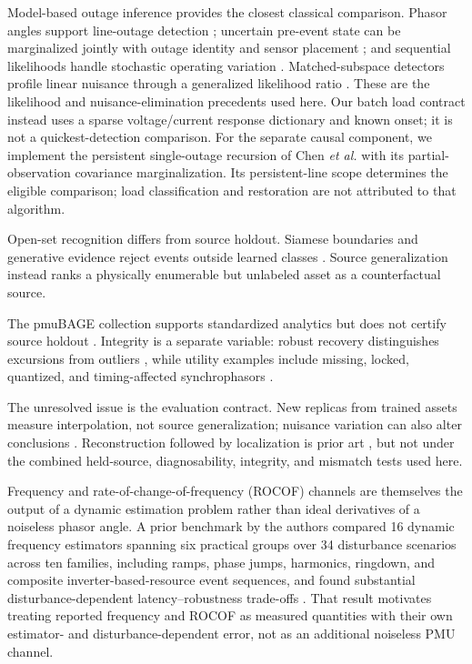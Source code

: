 Model-based outage inference provides the closest classical comparison. Phasor angles support line-outage detection \cite{tate2008outage}; uncertain pre-event state can be marginalized jointly with outage identity and sensor placement \cite{zhao2014outages}; and sequential likelihoods handle stochastic operating variation \cite{chen2016quickest,rovatsos2017outage}. Matched-subspace detectors profile linear nuisance through a generalized likelihood ratio \cite{scharf1994matched}. These are the likelihood and nuisance-elimination precedents used here. Our batch load contract instead uses a sparse voltage/current response dictionary and known onset; it is not a quickest-detection comparison. For the separate causal component, we implement the persistent single-outage recursion of Chen \emph{et al.} with its partial-observation covariance marginalization. Its persistent-line scope determines the eligible comparison; load classification and restoration are not attributed to that algorithm.

Open-set recognition differs from source holdout. Siamese boundaries and generative evidence reject events outside learned classes \cite{kummerow2022siamese,kummerow2023sigmoid,hu2026openset}. Source generalization instead ranks a physically enumerable but unlabeled asset as a counterfactual source.

The pmuBAGE collection supports standardized analytics but does not certify source holdout \cite{foggo2024pmubage}. Integrity is a separate variable: robust recovery distinguishes excursions from outliers \cite{chatterjee2020robust}, while utility examples include missing, locked, quantized, and timing-affected synchrophasors \cite{biswas2025quality}.

The unresolved issue is the evaluation contract. New replicas from trained assets measure interpolation, not source generalization; nuisance variation can also alter conclusions \cite{kummerow2023nuisance}. Reconstruction followed by localization is prior art \cite{zhai2025partial,rimkus2025gnn}, but not under the combined held-source, diagnosability, integrity, and mismatch tests used here.

Frequency and rate-of-change-of-frequency (ROCOF) channels are themselves the output of a dynamic estimation problem rather than ideal derivatives of a noiseless phasor angle. A prior benchmark by the authors compared 16 dynamic frequency estimators spanning six practical groups over 34 disturbance scenarios across ten families, including ramps, phase jumps, harmonics, ringdown, and composite inverter-based-resource event sequences, and found substantial disturbance-dependent latency--robustness trade-offs \cite{Mayorga2026FrequencyBenchmark}. That result motivates treating reported frequency and ROCOF as measured quantities with their own estimator- and disturbance-dependent error, not as an additional noiseless PMU channel.

